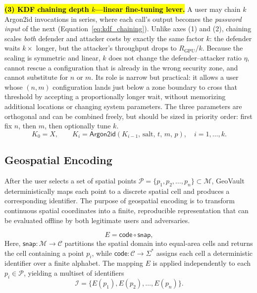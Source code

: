 \documentclass[mathematics,article,accept,pdftex,moreauthors]{Definitions/mdpi}
\begin{document}
{\textbf{\hl{(3) KDF chaining depth $k$---linear fine-tuning lever.}} A user may chain $k$ Argon2id invocations in series, where each call's output becomes the \emph{password input} of the next (Equation~\eqref{eq:kdf_chaining}). Unlike axes (1) and (2), chaining scales \emph{both} defender and attacker costs by exactly the same factor $k$: the defender waits $k\times$ longer, but the attacker's throughput drops to $R_\text{GPU}/k$. Because the scaling is symmetric and linear, $k$ does not change the defender--attacker ratio $\eta$, cannot rescue a configuration that is already in the wrong security zone, and cannot substitute for $n$ or $m$. Its role is narrow but practical: it allows a user whose $(n, m)$ configuration lands just below a zone boundary to cross that threshold by accepting a proportionally longer wait, without memorizing additional locations or changing system parameters. The three parameters are orthogonal and can be combined freely, but should be sized in priority order: first fix $n$, then $m$, then optionally tune $k$.}
\begin{equation}
K_0 = X, \qquad K_i = \mathsf{Argon2id}(K_{i-1},\,\text{salt},\,t,\,m,\,p), \quad i = 1, \dots, k.
\label{eq:kdf_chaining}
\end{equation}


\subsection{Geospatial Encoding}
\label{sec:spatial_models}

After the user selects a set of spatial points $\mathcal{P} = \{p_1, p_2, \dots, p_n\} \subset \mathcal{M}$, GeoVault deterministically maps each point to a discrete spatial cell and produces a corresponding identifier. The purpose of geospatial encoding is to transform continuous spatial coordinates into a finite, reproducible representation that can be evaluated offline by both legitimate users and adversaries.

\begin{equation}
    E = \mathsf{code} \circ \mathsf{snap},
    \label{eq:encode_composition}
\end{equation}
Here, $\mathsf{snap}: \mathcal{M} \rightarrow \mathcal{C}$ partitions the spatial domain into equal-area cells and returns the cell containing a point $p_i$, while $\mathsf{code}: \mathcal{C} \rightarrow \Sigma^{*}$ assigns each cell a deterministic identifier over a finite alphabet. The mapping $E$ is applied independently to each $p_i \in \mathcal{P}$, yielding a multiset of identifiers
\begin{equation}
    \mathcal{I} = \{E(p_1), E(p_2), \dots, E(p_n)\}.
    \label{eq:identifier_multiset}
\end{equation}
\end{document}

